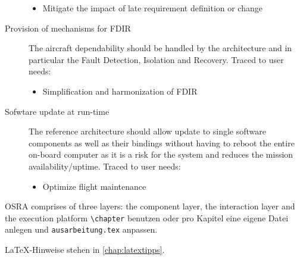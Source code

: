 \begin{description}
\begin{itemize}
\item Mitigate the impact of late requirement definition or change 
\end{itemize}
\item [Provision of mechanisms for FDIR] The aircraft dependability should be handled by the architecture and in particular the Fault Detection, Isolation and Recovery. Traced to user needs:
\begin{itemize}
\item Simplification and harmonization of FDIR  
\end{itemize}
\item [Sofwtare update at run-time] The reference architecture should allow update to single software components as well as their bindings without having to reboot the entire on-board computer as it is a risk for the system and reduces the mission availability/uptime. Traced to user needs:
\begin{itemize}
\item Optimize flight maintenance 
\end{itemize}
\end{description} 

OSRA comprises of three layers: the component layer, the interaction layer and the execution platform
\texttt{\textbackslash{}chapter} benutzen oder pro Kapitel eine eigene Datei anlegen und \texttt{ausarbeitung.tex} anpassen.

LaTeX-Hinweise stehen in \cref{chap:latextipps}.

\blinddocument
